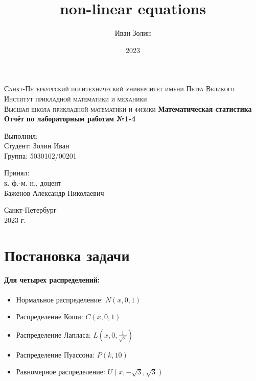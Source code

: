 \documentclass[a4paper,14pt]{article}
\title{non-linear equations}
\author{Иван Золин}
\date{2023}
\begin{document}
	
	\begin{titlepage}
		\begin{center}
			\textsc{
				Санкт-Петербургский политехнический университет имени Петра Великого \\[5mm]
				Институт прикладной математики и механики\\[2mm]
				Высшая школа прикладной математики и физики            
			}   
			\vfill
			\textbf{\large
				Математическая статистика\\
				Отчёт по лабораторным работам №1-4 \\[3mm]
			}                
		\end{center}
		
		\vfill
		\hfill
		\begin{minipage}{0.5\textwidth}
			Выполнил: \\[2mm]   
			Студент: Золин Иван \\
			Группа: 5030102/00201\\
		\end{minipage}
		
		\hfill
		\begin{minipage}{0.5\textwidth}
			Принял: \\[2mm]
			к. ф.-м. н., доцент \\   
			Баженов Александр Николаевич
		\end{minipage}
		
		\vfill
		\begin{center}
			Санкт-Петербург \\2023 г.
		\end{center}
	\end{titlepage}
	
	\tableofcontents
	\newpage
	\listoffigures
	\newpage
	\listoftables
	\newpage
	
	\section{Постановка задачи}
	\paragraph{Для четырех распределений:}
	\begin{itemize}
		\item Нормальное распределение: $N(x, 0, 1)$
		\item Распределение Коши: $C(x, 0, 1)$
		\item Распределение Лапласа: $L(x, 0, \frac{1}{\sqrt{2}})$
		\item Распределение Пуассона: $P(k, 10)$
		\item Равномерное распределение: $U(x, -\sqrt{3}, \sqrt{3})$
	\end{itemize}
\end{document}
